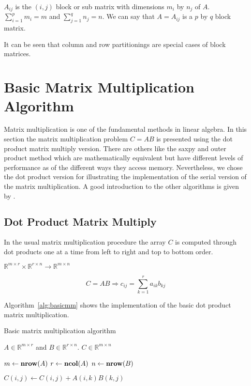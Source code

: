$A_{ij}$ is the $(i,j)$ block or sub matrix with dimensions $m_i$ by
$n_j$ of $A$. $\sum_{i=1}^p m_i = m$ and $\sum_{j=1}^q n_j = n$. 
We can say that $A = A_{ij}$ is a $p$ by $q$ block
matrix.   

It can be seen that column and row partitionings are special cases of
block matrices.

\section{Basic Matrix Multiplication Algorithm}

Matrix multiplication is one of the fundamental methods in linear
algebra. In 
this section the matrix multiplication problem $C = AB$ is
presented using the dot product matrix multiply version. There are
others like the saxpy and outer product method which are
mathematically equivalent but have different levels of
performance as of the different ways they access memory. Nevertheless,
we chose the dot product version for illustrating the implementation
of the serial version of the matrix multiplication. A good
introduction to the other algorithms is given by \cite{golub96mc}. 

\subsection{Dot Product Matrix Multiply}
In the usual matrix multiplication procedure the array $C$ is computed
through dot products one at a time from left to right and top to
bottom order.
\newline

$\mathbb{R}^{m \times r} \times
\mathbb{R}^{r \times n} \to \mathbb{R}^{m \times n}$

$$ C = AB \Longrightarrow c_{ij} = \sum_{k=1}^r a_{ik}b_{kj} $$

Algorithm~\ref{alg:basicmm} shows the implementation of the basic dot
product matrix multiplication.

\begin{algorithm}
\caption{Basic matrix multiplication algorithm}
\label{alg:basicmm}
\begin{algorithmic}[1]

  \REQUIRE $A \in \mathbb{R}^{m \times r}$ and $B \in \mathbb{R}^{r
    \times n}$.
  \ENSURE $C \in \mathbb{R}^{m \times n}$

  \STATE $m \leftarrow \textbf{nrow} (A)$
  \STATE $r \leftarrow \textbf{ncol} (A)$
  \STATE $n \leftarrow \textbf{nrow} (B)$

         \STATE $C(i,j) \leftarrow C(i,j) + A(i,k)B(k,j)$
       \ENDFOR
    \ENDFOR
  \ENDFOR

\end{algorithmic}
\end{algorithm}

